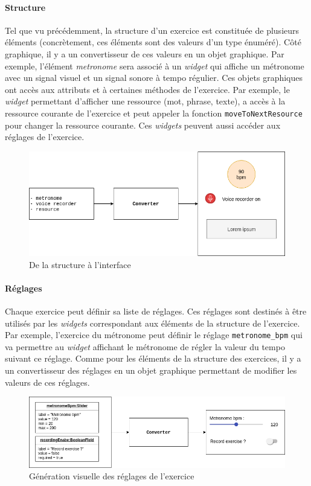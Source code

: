 \paragraph{Structure}
Tel que vu précédemment, la structure d'un exercice est constituée de plusieurs éléments (concrètement, ces éléments sont des valeurs d'un type énuméré). Côté graphique, il y a un convertisseur de ces valeurs en un objet graphique. Par exemple, l'élément \textit{metronome} sera associé à un \textit{widget} qui affiche un métronome avec un signal visuel et un signal sonore à tempo régulier. Ces objets graphiques ont accès aux attributs et à certaines méthodes de l'exercice. Par exemple, le \textit{widget} permettant d'afficher une ressource (mot, phrase, texte), a accès à la ressource courante de l'exercice et peut appeler la fonction \texttt{moveToNextResource} pour changer la ressource courante. Ces \textit{widgets} peuvent aussi accéder aux réglages de l'exercice.

\begin{figure}[H]
  \includegraphics[width=0.8\linewidth]{content/imgs/struc.png}
  \caption{De la structure à l'interface}
  \label{fig:struc}
\end{figure}

\paragraph{Réglages}
Chaque exercice peut définir sa liste de réglages. Ces réglages sont destinés à être utilisés par les \textit{widgets} correspondant aux éléments de la structure de l'exercice. Par exemple, l'exercice du métronome peut définir le réglage \texttt{metronome\_bpm} qui va permettre au \textit{widget} affichant le métronome de régler la valeur du tempo suivant ce réglage. Comme pour les éléments de la structure des exercices, il y a un convertisseur des réglages en un objet graphique permettant de modifier les valeurs de ces réglages.

\begin{figure}[H]
  \includegraphics[width=0.8\linewidth]{content/imgs/settings.png}
  \caption{Génération visuelle des réglages de l'exercice}
  \label{fig:settings}
\end{figure}

